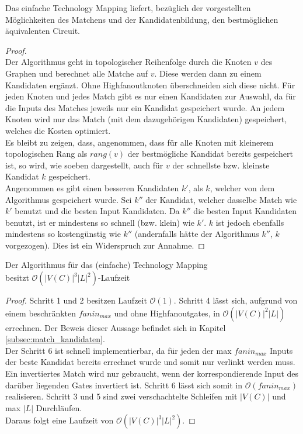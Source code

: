 \documentclass[11pt, a4paper, german]{article}
\newcommand{\TM}{Technology  Mapping }
\begin{document}
\begin{cor}
	Das einfache \TM  liefert, bezüglich der vorgestellten Möglichkeiten des Matchens und der Kandidatenbildung, den bestmöglichen äquivalenten Circuit.
\end{cor}
\begin{proof} \ \\
	Der Algorithmus geht in topologischer Reihenfolge durch die Knoten $v$ des Graphen und berechnet alle Matche auf $v$. Diese werden dann zu einem Kandidaten ergänzt. 
 Ohne Highfanoutknoten überschneiden sich diese nicht. Für jeden Knoten und jedes Match gibt es nur einen Kandidaten zur Auswahl, da für die Inputs des Matches jeweils nur ein Kandidat gespeichert wurde. An jedem Knoten wird nur das Match (mit dem dazugehörigen Kandidaten) gespeichert, welches die Kosten optimiert. \\
 Es bleibt zu zeigen, dass, angenommen, dass für alle Knoten mit kleinerem topologischen Rang als $rang(v)$ der bestmögliche Kandidat bereits gespeichert ist, so wird, wie soeben dargestellt, auch für $v$ der schnellste bzw. kleinste Kandidat $k$ gespeichert. \\
 Angenommen es gibt einen besseren Kandidaten $k'$, als $k$, welcher von dem Algorithmus gespeichert wurde. Sei $k''$ der Kandidat, welcher dasselbe Match wie $k'$ benutzt und die besten Input Kandidaten. Da $k''$ die besten Input Kandidaten benutzt, ist er mindestens so schnell (bzw. klein) wie $k'$. $k$ ist jedoch ebenfalls mindestens so kostengünstig wie $k''$ (andernfalls hätte der Algorithmus $k''$, $k$ vorgezogen). Dies ist ein Widerspruch zur Annahme. 
\end{proof}
 
\begin{cor}{Der Algorithmus für das (einfache) \TM  \\ besitzt $\mathcal{O}(  |V(C)|^3|L|^2)$-Laufzeit}
\end{cor}
\begin{proof}
Schritt 1 und 2 besitzen Laufzeit $\mathcal{O}(1)$. Schritt 4 lässt sich, aufgrund von einem beschränkten $fanin_{max}$ und ohne Highfanoutgates, in $\mathcal{O}(|V(C)|^2|L|)$ errechnen. Der Beweis dieser Aussage befindet sich in Kapitel \ref{subsec:match_kandidaten}.\\
Der Schritt 6 ist schnell implementierbar, da für jeden der max $fanin_{max}$ Inputs der beste Kandidat bereits errechnet wurde und somit nur verlinkt werden muss. Ein invertiertes Match wird nur gebraucht, wenn der korrespondierende Input des darüber liegenden Gates invertiert ist. Schritt 6 lässt sich somit in  $\mathcal{O}(fanin_{max})$ realisieren. Schritt 3 und 5 sind zwei verschachtelte Schleifen mit  $|V(C)|$ und max $|L|$ Durchläufen. \\
Daraus folgt eine Laufzeit von $\mathcal{O}(  |V(C)|^3|L|^2)$.
\end{proof}
\end{document}

